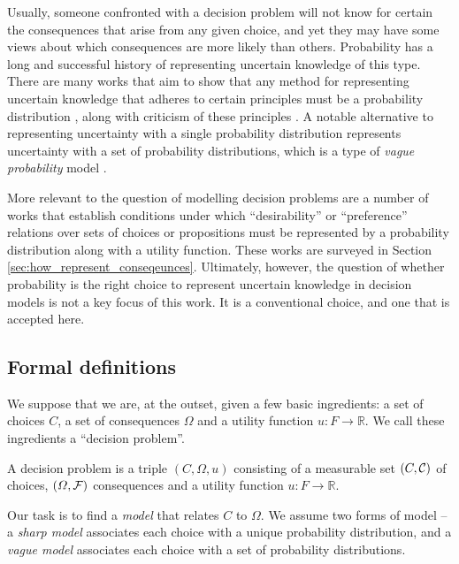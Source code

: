 Usually, someone confronted with a decision problem will not know for certain the consequences that arise from any given choice, and yet they may have some views about which consequences are more likely than others. Probability has a long and successful history of representing uncertain knowledge of this type. There are many works that aim to show that any method for representing uncertain knowledge that adheres to certain principles must be a probability distribution \citet{de_finetti_foresight_1992,horvitz_framework_1986}, along with criticism of these principles \citet{halpern_counter_1999}. A notable alternative to representing uncertainty with a single probability distribution represents uncertainty with a set of probability distributions, which is a type of \emph{vague probability} model \citep{walley_statistical_1991}. 

More relevant to the question of modelling decision problems are a number of works that establish conditions under which ``desirability'' or ``preference'' relations over sets of choices or propositions must be represented by a probability distribution along with a utility function. These works are surveyed in Section \ref{sec:how_represent_conseqeunces}. Ultimately, however, the question of whether probability is the right choice to represent uncertain knowledge in decision models is not a key focus of this work. It is a conventional choice, and one that is accepted here.

\subsection{Formal definitions}\label{sec:probability_sets}

We suppose that we are, at the outset, given a few basic ingredients: a set of choices $C$, a set of consequences $\Omega$ and a utility function $u:F\to \mathbb{R}$. We call these ingredients a ``decision problem''.

\begin{definition}
A decision problem is a triple $(C,\Omega,u)$ consisting of a measurable set $(C,\mathcal{C})$ of choices, $(\Omega,\mathcal{F})$ consequences and a utility function $u:F\to \mathbb{R}$.
\end{definition}

Our task is to find a \emph{model} that relates $C$ to $\Omega$. We assume two forms of model -- a \emph{sharp model} associates each choice with a unique probability distribution, and a \emph{vague model} associates each choice with a set of probability distributions.

